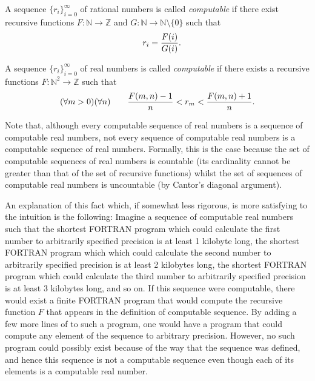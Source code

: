 \documentclass[12pt]{article}
\begin{document}

A sequence $\{r_i\}_{i=0}^\infty$ of rational numbers is called \emph{computable} if there exist recursive functions $F \colon \mathbb{N} \to \mathbb{Z}$ and $G \colon \mathbb{N} \to \mathbb{N} \setminus \{0\}$ such that
 $$\quad r_i = {F(i) \over G(i)}.$$

A sequence $\{r_i\}_{i=0}^\infty$ of real numbers is called \emph{computable} if there exists a recursive functions $F \colon \mathbb{N}^2 \to \mathbb{Z}$ such that
 $$(\forall m > 0) (\forall n) \qquad {F(m,n) - 1 \over n} < r_m < {F(m,n) + 1 \over n}.$$

Note that, although every computable sequence of real numbers is a sequence of computable real numbers, not every sequence of computable real numbers is a computable sequence of real numbers.  Formally, this is the case because the set of computable sequences of real numbers is countable (its cardinality cannot be greater than that of the set of recursive functions) whilst the set of sequences of computable real numbers is uncountable (by Cantor's diagonal argument).

An explanation of this fact which, if somewhat less rigorous, is more satisfying to the intuition is the following:  Imagine a sequence of computable real numbers such that the shortest FORTRAN program which could calculate the first number to arbitrarily specified precision is at least 1 kilobyte long, the shortest FORTRAN program which which could calculate the second number to arbitrarily specified precision is at least 2 kilobytes long, the shortest FORTRAN program which could calculate the third number to arbitrarily specified precision is at least 3 kilobytes long, and so on.  If this sequence were computable, there would exist a finite FORTRAN program that would compute the recursive function $F$ that appears in the definition of computable sequence.  By adding a few more lines of  to such a program, one would have a program that could compute any element of the sequence to arbitrary precision.  However, no such program could possibly exist because of the way that the sequence was defined, and hence this sequence is not a computable sequence even though each of its elements is a computable real number.
\end{document}
